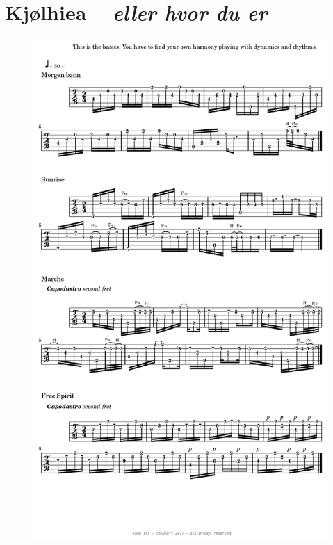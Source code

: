 \documentclass{book}
\begin{document}
\section{Kj{\o}lhiea -- \textsl{eller hvor du er}}
\label{kj}
\begin{figure}[H]
\begin{center}
\includegraphics[scale=0.31]{img/5572}
\end{center}
\end{figure}

\newpage
\end{document}

